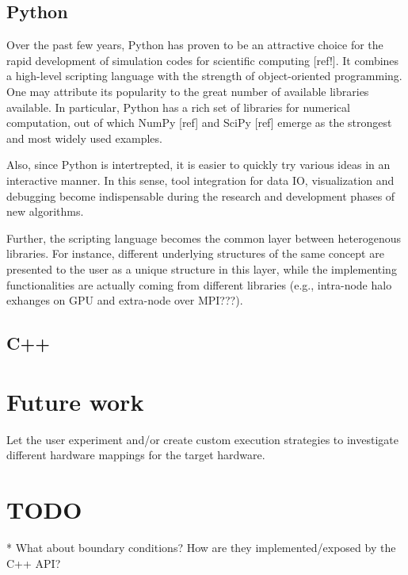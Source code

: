 \documentclass[english]{article}
\begin{document}
\subsection{Python}
Over the past few years, Python has proven to be an attractive choice for the rapid development of simulation codes for scientific computing [ref!].
It combines a high-level scripting language with the strength of object-oriented programming.
One may attribute its popularity to the great number of available libraries available.
In particular, Python has a rich set of libraries for numerical computation, out of which NumPy [ref] and SciPy [ref] emerge as the strongest and most widely used examples.

Also, since Python is intertrepted, it is easier to quickly try various ideas in an interactive manner.
In this sense, tool integration for data IO, visualization and debugging become indispensable during the research and development phases of new algorithms.

Further, the scripting language becomes the common layer between heterogenous libraries.
For instance, different underlying structures of the same concept are presented to the user as a unique structure in this layer, while the implementing functionalities are actually coming from different libraries (e.g., intra-node halo exhanges on GPU and extra-node over MPI???).

\subsection{C++}

\section{Future work}
Let the user experiment and/or create custom execution strategies to investigate different hardware mappings for the target hardware.

\section{TODO}
* What about boundary conditions? How are they implemented/exposed by the C++ API?
\end{document}
